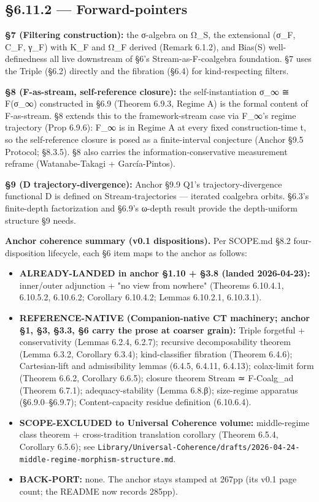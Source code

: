 \documentclass[11pt, openany]{book}
\begin{document}
\subsection{§6.11.2 --- Forward-pointers}

\textbf{§7 (Filtering construction):} the σ-algebra on Ω\_\allowbreak{}S, the extensional (σ\_\allowbreak{}F, C\_\allowbreak{}F, γ\_\allowbreak{}F) with K\_\allowbreak{}F and Ω\_\allowbreak{}F derived (Remark 6.1.2), and Bias(S) well-definedness all live downstream of §6's Stream-as-F-coalgebra foundation. §7 uses the Triple (§6.2) directly and the fibration (§6.4) for kind-respecting filters.

\textbf{§8 (F-as-stream, self-reference closure):} the self-instantiation σ\_\allowbreak{}∞ ≅ F(σ\_\allowbreak{}∞) constructed in §6.9 (Theorem 6.9.3, Regime A) is the formal content of F-as-stream. §8 extends this to the framework-stream case via F\_\allowbreak{}∞'s regime trajectory (Prop 6.9.6): F\_\allowbreak{}∞ is in Regime A at every fixed construction-time t, so the self-reference closure is posed as a finite-interval conjecture (Anchor §9.5 Protocol; §8.3.5). §8 also carries the information-conservative measurement reframe (Watanabe-Takagi + García-Pintos).

\textbf{§9 (D trajectory-divergence):} Anchor §9.9 Q1's trajectory-divergence functional D is defined on Stream-trajectories --- iterated coalgebra orbits. §6.3's finite-depth factorization and §6.9's ω-depth result provide the depth-uniform structure §9 needs.

\textbf{Anchor coherence summary (v0.1 dispositions).} Per SCOPE.md §8.2 four-disposition lifecycle, each §6 item maps to the anchor as follows:

\begin{itemize}
\item \textbf{ALREADY-LANDED in anchor §1.10 + §3.8 (landed 2026-04-23):} inner/outer adjunction + "no view from nowhere" (Theorems 6.10.4.1, 6.10.5.2, 6.10.6.2; Corollary 6.10.4.2; Lemmas 6.10.2.1, 6.10.3.1).
\item \textbf{REFERENCE-NATIVE (Companion-native CT machinery; anchor §1, §3, §3.3, §6 carry the prose at coarser grain):} Triple forgetful + conservativity (Lemmas 6.2.4, 6.2.7); recursive decomposability theorem (Lemma 6.3.2, Corollary 6.3.4); kind-classifier fibration (Theorem 6.4.6); Cartesian-lift and admissibility lemmas (6.4.5, 6.4.11, 6.4.13); colax-limit form (Theorem 6.6.2, Corollary 6.6.5); closure theorem Stream ≃ F-Coalg\_\allowbreak{}ad (Theorem 6.7.1); adequacy-stability (Lemma 6.8.β); size-regime apparatus (§6.9.0–§6.9.7); Content-capacity residue definition (6.10.6.4).
\item \textbf{SCOPE-EXCLUDED to Universal Coherence volume:} middle-regime class theorem + cross-tradition translation corollary (Theorem 6.5.4, Corollary 6.5.6); see \texttt{Library/Universal-Coherence/drafts/2026-04-24-middle-regime-morphism-structure.md}.
\item \textbf{BACK-PORT:} none. The anchor stays stamped at 267pp (its v0.1 page count; the README now records 285pp).
\end{itemize}
\end{document}
